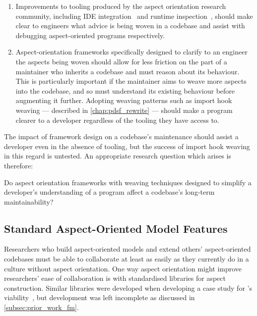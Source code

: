 \begin{enumerate}
    \item Improvements to tooling produced by the aspect orientation research
    community, including IDE integration~\cite{clement2003eclipseAJDT} and
    runtime inspection~\cite{mehner2002towards}, should make clear to engineers
    what advice is being woven in a codebase and assist with debugging
    aspect-oriented programs respectively.
    \item Aspect-orientation frameworks specifically designed to clarify to an
    engineer the aspects being woven should allow for less friction on the part
    of a maintainer who inherits a codebase and must reason about its behaviour.
    This is particularly important if the maintainer aims to weave more aspects
    into the codebase, and so must understand its existing behaviour before
    augmenting it further. Adopting weaving patterns such as import hook weaving
    --- described in \cref{chap:pdsf_rewrite} --- should make a program clearer
    to a developer regardless of the tooling they have access to.
\end{enumerate}

The impact of framework design on a codebase's maintenance should assist a
developer even in the absence of tooling, but the success of import hook weaving
in this regard is untested. An appropriate research question which arises is
therefore:

\begin{researchquestion}
Do aspect orientation frameworks with weaving techniques designed to simplify a
developer's understanding of a program affect a codebase's long-term
maintainability?
\end{researchquestion}


\subsection{Standard Aspect-Oriented Model
Features}
\label{standard_aosm_model_features}

Researchers who build aspect-oriented models and extend others' aspect-oriented
codebases must be able to collaborate at least as easily as they currently do in
a culture without aspect orientation. One way aspect orientation might improve
researchers' ease of collaboration is with standardised libraries for aspect
construction. Similar libraries were developed when developing a case study for
\pdsf{}'s viability~\cite{wallis2018caise,fuzzimoss_repo}, but development was
left incomplete as discussed in \cref{subsec:prior_work_fm}.

